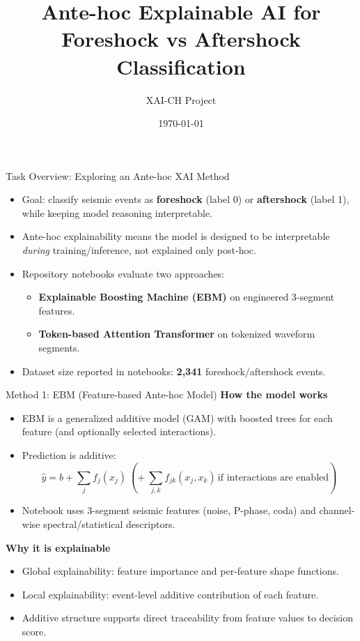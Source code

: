 \documentclass[aspectratio=169]{beamer}
\title{Ante-hoc Explainable AI for\\Foreshock vs Aftershock Classification}
\author{XAI-CH Project}
\date{\today}
\begin{document}
\begin{frame}
  \titlepage
\end{frame}

\begin{frame}{Task Overview: Exploring an Ante-hoc XAI Method}
\begin{itemize}
  \item Goal: classify seismic events as \textbf{foreshock} (label 0) or \textbf{aftershock} (label 1), while keeping model reasoning interpretable.
  \item Ante-hoc explainability means the model is designed to be interpretable \emph{during} training/inference, not explained only post-hoc.
  \item Repository notebooks evaluate two approaches:
  \begin{itemize}
      \item \textbf{Explainable Boosting Machine (EBM)} on engineered 3-segment features.
      \item \textbf{Token-based Attention Transformer} on tokenized waveform segments.
  \end{itemize}
  \item Dataset size reported in notebooks: \textbf{2,341} foreshock/aftershock events.
\end{itemize}
\end{frame}

\begin{frame}{Method 1: EBM (Feature-based Ante-hoc Model)}
\textbf{How the model works}
\begin{itemize}
  \item EBM is a generalized additive model (GAM) with boosted trees for each feature (and optionally selected interactions).
  \item Prediction is additive:
  \[
    \hat{y} = b + \sum_j f_j(x_j)\ (+\ \sum_{j,k} f_{jk}(x_j,x_k)\,\text{if interactions are enabled})
  \]
  \item Notebook uses 3-segment seismic features (noise, P-phase, coda) and channel-wise spectral/statistical descriptors.
\end{itemize}

\textbf{Why it is explainable}
\begin{itemize}
  \item Global explainability: feature importance and per-feature shape functions.
  \item Local explainability: event-level additive contribution of each feature.
  \item Additive structure supports direct traceability from feature values to decision score.
\end{itemize}
\end{frame}
\end{document}
